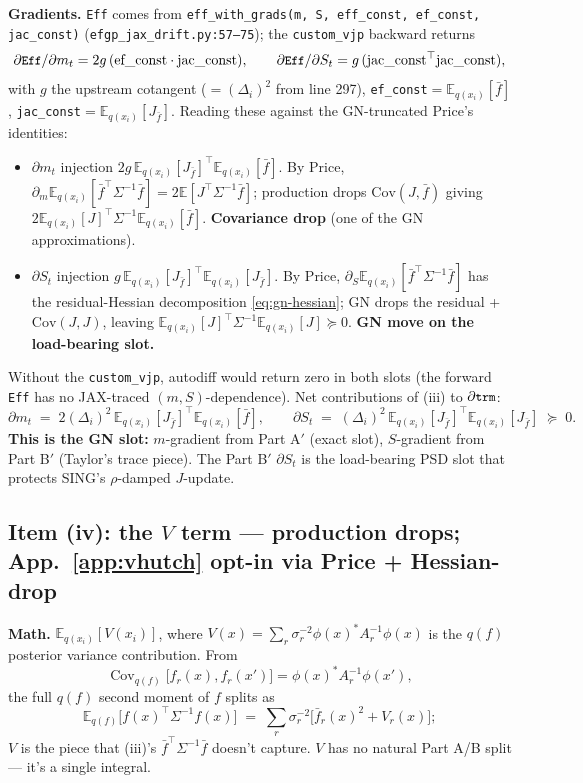 \documentclass[11pt]{article}
\newcommand{\E}{\mathbb{E}}
\newcommand{\Eq}[1][q]{\mathbb{E}_{#1}}
\newcommand{\Eqx}{\mathbb{E}_{q(x_i)}}
\newcommand{\Cov}{\operatorname{Cov}}
\newcommand{\code}[1]{\texttt{\small #1}}
\begin{document}
\textbf{Gradients.} \code{Eff} comes from
\code{eff\_with\_grads(m, S, eff\_const, ef\_const, jac\_const)}
(\code{efgp\_jax\_drift.py:57--75}); the \code{custom\_vjp} backward
returns
\begin{equation*}
\partial\code{Eff}/\partial m_t = 2g\,(\text{ef\_const}\cdot\text{jac\_const}),
\qquad
\partial\code{Eff}/\partial S_t = g\,(\text{jac\_const}^\top\text{jac\_const}),
\end{equation*}
with $g$ the upstream cotangent ($=(\Delta_i)^2$ from line 297),
\code{ef\_const}$=\Eqx[\bar f]$, \code{jac\_const}$=\Eqx[J_{\bar f}]$.
Reading these against the GN-truncated Price's identities:
\begin{itemize}\setlength\itemsep{2pt}
\item $\partial m_t$ injection $2g\,\Eqx[J_{\bar f}]^\top \Eqx[\bar f]$.
  By Price, $\partial_m \Eqx[\bar f^\top\Sigma^{-1}\bar f] =
  2\E[J^\top\Sigma^{-1}\bar f]$; production drops $\text{Cov}(J,\bar f)$
  giving $2\Eqx[J]^\top\Sigma^{-1}\Eqx[\bar f]$. \textbf{Covariance
  drop} (one of the GN approximations).
\item $\partial S_t$ injection $g\,\Eqx[J_{\bar f}]^\top \Eqx[J_{\bar f}]$.
  By Price, $\partial_S\Eqx[\bar f^\top\Sigma^{-1}\bar f]$ has the
  residual-Hessian decomposition \eqref{eq:gn-hessian}; GN drops the
  residual + $\text{Cov}(J,J)$, leaving
  $\Eqx[J]^\top\Sigma^{-1}\Eqx[J]\succeq 0$. \textbf{GN move on the
  load-bearing slot.}
\end{itemize}
Without the \code{custom\_vjp}, autodiff would return zero in both
slots (the forward \code{Eff} has no JAX-traced $(m, S)$-dependence).
Net contributions of (iii) to $\partial \code{trm}$:
\begin{equation*}
\partial m_t \;=\; 2(\Delta_i)^2\,\Eqx[J_{\bar f}]^\top\Eqx[\bar f],
\qquad
\partial S_t \;=\; (\Delta_i)^2\,\Eqx[J_{\bar f}]^\top\Eqx[J_{\bar f}]\;\succeq\;0.
\end{equation*}
\textbf{This is the GN slot:} $m$-gradient
from Part A$'$ (exact slot), $S$-gradient from Part B$'$ (Taylor's
trace piece). The Part B$'$ $\partial S_t$ is the load-bearing PSD slot
that protects SING's $\rho$-damped $J$-update.

\subsection*{Item (iv): the $V$ term --- production drops; App.~\ref{app:vhutch} opt-in via Price + Hessian-drop}

\textbf{Math.} $\Eqx[V(x_i)]$, where $V(x) =
\sum_r\sigma_r^{-2}\phi(x)^* A_r^{-1}\phi(x)$ is the $q(f)$ posterior
variance contribution. From
\begin{equation}
\Cov_{q(f)}\!\bigl[f_r(x), f_r(x')\bigr] = \phi(x)^* A_r^{-1}\phi(x'),
\label{eq:qf-cov}
\end{equation}
the full $q(f)$ second moment of $f$ splits as
\begin{equation}
\Eq[q(f)]\!\bigl[f(x)^\top \Sigma^{-1} f(x)\bigr]
\;=\; \sum_r \sigma_r^{-2}\bigl[\bar f_r(x)^2 + V_r(x)\bigr];
\label{eq:Eff-full}
\end{equation}
$V$ is the piece that (iii)'s $\bar f^\top \Sigma^{-1}\bar f$ doesn't
capture. $V$ has no natural Part A/B split --- it's a single integral.
\end{document}
